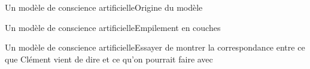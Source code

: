 \begin{frame}{Un modèle de conscience artificielle}{Origine du modèle}

\end{frame}

\begin{frame}{Un modèle de conscience artificielle}{Empilement en couches}

\end{frame}

\begin{frame}{Un modèle de conscience artificielle}{Essayer de montrer la correspondance entre ce que Clément vient de dire et ce qu'on pourrait faire avec}

\end{frame}